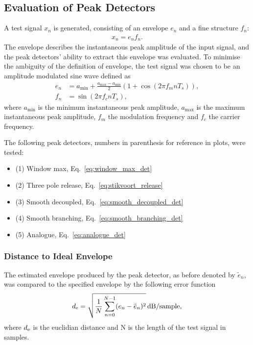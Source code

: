 \documentclass[../main2.tex]{subfiles}
\begin{document}
\subsection{Evaluation of Peak Detectors}\label{method_peak_detectors}
A test signal $x_n$ is generated, consisting of an envelope $e_n$ and a fine structure $f_n$:
\begin{align}
x_n = e_n f_n.
\end{align}
The envelope describes the instantaneous peak amplitude of the input signal, and the peak detectors' ability to extract this envelope was evaluated. To minimise the ambiguity of the definition of envelope, the test signal was chosen to be an amplitude modulated sine wave defined as
\begin{equation}
\begin{split}
	e_n &= a_\text{min} + \frac{a_\text{max}- a_\text{min}}{2} \left(1 + \cos(2 \pi f_m n T_s) \right), \\
	f_n &= \sin(2 \pi f_c n T_s),
\end{split} \label{eq:test_signal}
\end{equation}
where $a_\text{min}$ is the minimum instantaneous peak amplitude, $a_\text{max}$ is the maximum instantaneous peak amplitude, $f_m$ the modulation frequency and $f_c$ the carrier frequency.

The following peak detectors, numbers in parenthesis for reference in plots, were tested:
\begin{itemize}
\item (1) Window max, Eq.~\eqref{eq:window_max_det}
\item (2) Three pole release, Eq.~\eqref{eq:stikvoort_release}
\item (3) Smooth decoupled, Eq.~\eqref{eq:smooth_decoupled_det}
\item (4) Smooth branching, Eq.~\eqref{eq:smooth_branching_det}
\item (5) Analogue,  Eq.~\eqref{eq:analogue_det}
\end{itemize}

\subsubsection{Distance to Ideal Envelope}
The estimated envelope produced by the peak detector, as before denoted by $\tilde{e}_n$, was compared to the specified envelope
by the following error function
\begin{equation}
d_\text{e} = \sqrt{ \frac{1}{N}\sum_{n = 0}^{N-1} (e_n - \tilde{e}_n)^2 } \mskip3mu\text{dB} / \text{sample},
\end{equation}
where $d_\text{e}$ is the euclidian distance and N is the length of the test signal in samples. 
\end{document}
